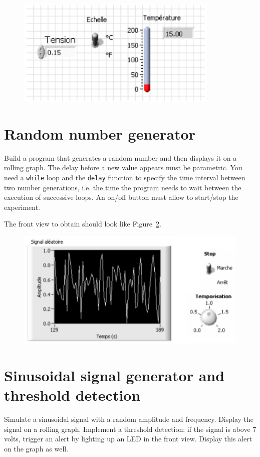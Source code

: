 \documentclass{labo}
\begin{document}
\begin{figure}[h!]
\centering
\includegraphics[width=.6\textwidth]{display-panel.png}
\caption{}\label{fig:display-panel}
\end{figure}




\section{Random number generator}
Build a program that generates a random number and then displays it on a rolling graph.
The delay before a new value appears must be parametric.
You need a \texttt{while} loop and the \texttt{delay} function to specify the time interval between two number generations, i.e. the time the program needs to wait between the execution of successive loops.
An on/off button must allow to start/stop the experiment.

The front view to obtain should look like Figure~\ref{fig:rng}.

\begin{figure}[h!]
\centering
\includegraphics[width=.7\textwidth]{rng.png}
\caption{}\label{fig:rng}
\end{figure}



\section{Sinusoidal signal generator and threshold detection}
Simulate a sinusoidal signal with a random amplitude and frequency.
Display the signal on a rolling graph.
Implement a threshold detection: if the signal is above 7 volts, trigger an alert by lighting up an LED in the front view.
Display this alert on the graph as well.
\end{document}
